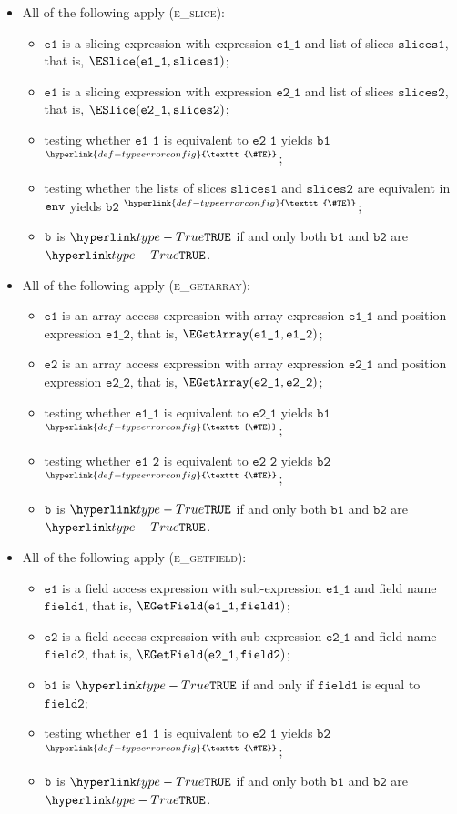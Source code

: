 \documentclass{book}
\newcommand\TypeErrorConfig[0]{\hyperlink{def-typeerrorconfig}{\texttt{\#TE}}}
\newcommand\ProseOrTypeError[0]{\hyperlink{def-proseortypeerror}{$^{\TypeErrorConfig}$}}
\newcommand\veone[0]{\texttt{e1}}
\newcommand\vetwo[0]{\texttt{e2}}
\newcommand\vfieldone[0]{\texttt{field1}}
\newcommand\vfieldtwo[0]{\texttt{field2}}
\newcommand\veoneone[0]{\texttt{e1\_1}}
\newcommand\veonetwo[0]{\texttt{e1\_2}}
\newcommand\vetwoone[0]{\texttt{e2\_1}}
\newcommand\vetwotwo[0]{\texttt{e2\_2}}
\newcommand\vbone[0]{\texttt{b1}}
\newcommand\vbtwo[0]{\texttt{b2}}
\newcommand\slicesone[0]{\texttt{slices1}}
\newcommand\slicestwo[0]{\texttt{slices2}}
\begin{document}
\begin{itemize}
  \item All of the following apply (\textsc{e\_slice}):
  \begin{itemize}
    \item $\veone$ is a slicing expression with expression $\veoneone$ and list of slices $\slicesone$,
          that is, $\ESlice(\veoneone, \slicesone)$;
    \item $\veone$ is a slicing expression with expression $\vetwoone$ and list of slices $\slicestwo$,
          that is, $\ESlice(\vetwoone, \slicestwo)$;
    \item testing whether $\veoneone$ is equivalent to $\vetwoone$ yields $\vbone$ \ProseOrTypeError;
    \item testing whether the lists of slices $\slicesone$ and $\slicestwo$ are equivalent in $\texttt{env}$ yields $\vbtwo$ \ProseOrTypeError;
    \item $\texttt{b}$ is $\True$ if and only both $\vbone$ and $\vbtwo$ are $\True$.
  \end{itemize}

  \item All of the following apply (\textsc{e\_getarray}):
  \begin{itemize}
    \item $\veone$ is an array access expression with array expression $\veoneone$ and position expression $\veonetwo$,
          that is, $\EGetArray(\veoneone, \veonetwo)$;
    \item $\vetwo$ is an array access expression with array expression $\vetwoone$ and position expression $\vetwotwo$,
          that is, $\EGetArray(\vetwoone, \vetwotwo)$;
    \item testing whether $\veoneone$ is equivalent to $\vetwoone$ yields $\vbone$ \ProseOrTypeError;
    \item testing whether $\veonetwo$ is equivalent to $\vetwotwo$ yields $\vbtwo$ \ProseOrTypeError;
    \item $\texttt{b}$ is $\True$ if and only both $\vbone$ and $\vbtwo$ are $\True$.
  \end{itemize}

  \item All of the following apply (\textsc{e\_getfield}):
  \begin{itemize}
    \item $\veone$ is a field access expression with sub-expression $\veoneone$ and field name $\vfieldone$,
          that is, $\EGetField(\veoneone, \vfieldone)$;
    \item $\vetwo$ is a field access expression with sub-expression $\vetwoone$ and field name $\vfieldtwo$,
          that is, $\EGetField(\vetwoone, \vfieldtwo)$;
    \item $\vbone$ is $\True$ if and only if $\vfieldone$ is equal to $\vfieldtwo$;
    \item testing whether $\veoneone$ is equivalent to $\vetwoone$ yields $\vbtwo$ \ProseOrTypeError;
    \item $\texttt{b}$ is $\True$ if and only both $\vbone$ and $\vbtwo$ are $\True$.
  \end{itemize}


\end{itemize}
\end{document}
